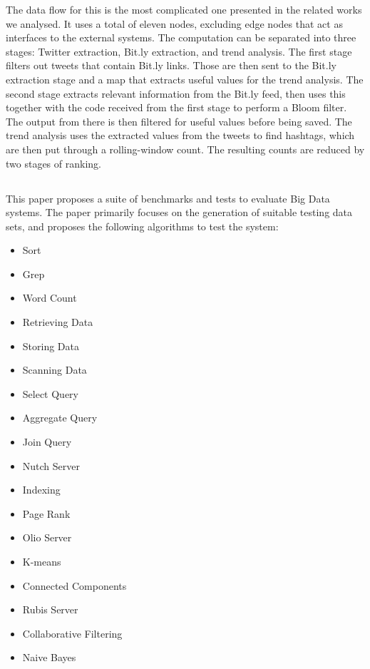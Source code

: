 
The data flow for this is the most complicated one presented in the related works we analysed. It uses a total of eleven nodes, excluding edge nodes that act as interfaces to the external systems. The computation can be separated into three stages: Twitter extraction, Bit.ly extraction, and trend analysis. The first stage filters out tweets that contain Bit.ly links. Those are then sent to the Bit.ly extraction stage and a map that extracts useful values for the trend analysis. The second stage extracts relevant information from the Bit.ly feed, then uses this together with the code received from the first stage to perform a Bloom filter. The output from there is then filtered for useful values before being saved. The trend analysis uses the extracted values from the tweets to find hashtags, which are then put through a rolling-window count. The resulting counts are reduced by two stages of ranking.

\subsection{}
This paper proposes a suite of benchmarks and tests to evaluate Big Data systems. The paper primarily focuses on the generation of suitable testing data sets, and proposes the following algorithms to test the system:

\begin{multicols}{2}
  \begin{itemize}
  \item Sort
  \item Grep
  \item Word Count
  \item Retrieving Data
  \item Storing Data
  \item Scanning Data
  \item Select Query
  \item Aggregate Query
  \item Join Query
  \item Nutch Server
  \item Indexing
  \item Page Rank
  \item Olio Server
  \item K-means
  \item Connected Components
  \item Rubis Server
  \item Collaborative Filtering
  \item Naive Bayes
  \end{itemize}
\end{multicols}

